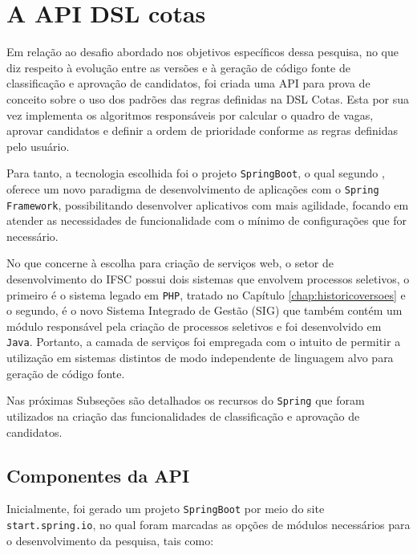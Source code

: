 \section{A API DSL cotas}
\label{apicotas}

Em relação ao desafio abordado nos objetivos específicos dessa pesquisa, no que diz respeito à evolução entre as versões e à geração de código fonte de classificação e aprovação de candidatos, foi criada uma \gls{API} para prova de conceito sobre o uso dos padrões das regras definidas na DSL Cotas. Esta por sua vez implementa os algoritmos responsáveis por calcular o quadro de vagas, aprovar candidatos e definir a ordem de prioridade conforme as regras definidas pelo usuário.


Para tanto, a tecnologia escolhida foi o projeto \texttt{SpringBoot}, o qual segundo , oferece um novo paradigma de desenvolvimento de aplicações com o \texttt{Spring Framework}, possibilitando desenvolver aplicativos com mais agilidade, focando em atender as necessidades de funcionalidade com o mínimo de configurações que for necessário.

No que concerne à escolha para criação de serviços web, o setor de desenvolvimento do \gls{IFSC} possui dois sistemas que envolvem processos seletivos, o primeiro é o sistema legado em \texttt{PHP}, tratado no Capítulo \ref{chap:historicoversoes} e o segundo, é o novo Sistema Integrado de Gestão (SIG) que também contém um módulo responsável pela criação de processos seletivos e foi desenvolvido em \texttt{Java}. Portanto, a camada de serviços foi empregada com o intuito de permitir a utilização em sistemas distintos de modo independente de linguagem alvo para geração de código fonte.


Nas próximas Subseções são detalhados os recursos do \texttt{Spring} que foram utilizados na criação das funcionalidades de classificação e aprovação de candidatos.


\subsection{Componentes da API}
\label{componentesapi}

Inicialmente, foi gerado um projeto \texttt{SpringBoot} por meio do site \texttt{start.spring.io}, no qual foram marcadas as opções de módulos necessários para o desenvolvimento da pesquisa, tais como:



